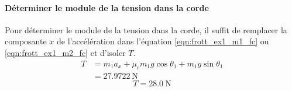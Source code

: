 \paragraph{Déterminer le module de la tension dans la corde}

Pour déterminer le module de la tension dans la corde, il suffit de remplacer
la composante $x$ de l'accélération dans l'équation \ref{eqn:frott_ex1_m1_fc}
ou \ref{eqn:frott_ex1_m2_fc} et d'isoler $T$.
\begin{align*}
  T &= m_1a_x + \mu_c m_1 g \cos\theta_1 + m_1 g \sin\theta_1 \\
    &= \SI{27.9722}{\newton}
\end{align*}
\[
  \boxed{T = \SI{28.0}{\newton}}
\]


